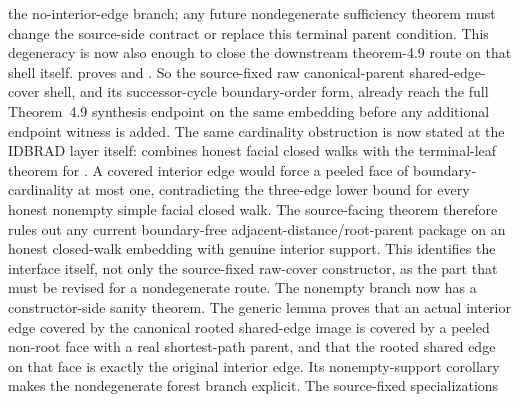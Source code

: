 \documentclass[11pt]{article}
\begin{document}
the no-interior-edge branch; any future nondegenerate sufficiency theorem must
change the source-side contract or replace this terminal parent condition.
This degeneracy is now also enough to close the downstream theorem-4.9 route on
that shell itself.   proves
and
.
So the source-fixed raw canonical-parent shared-edge-cover shell, and its
successor-cycle boundary-order form, already reach the full Theorem~4.9
synthesis endpoint on the same embedding before any additional endpoint witness
is added.
The same cardinality obstruction is now stated at the IDBRAD layer itself:
combines honest facial closed walks with the terminal-leaf theorem for
.  A covered interior edge
would force a peeled face of boundary-cardinality at most one, contradicting
the three-edge lower bound for every honest nonempty simple facial closed
walk.  The source-facing theorem
therefore rules out any current boundary-free adjacent-distance/root-parent
package on an honest closed-walk embedding with genuine interior support.
This identifies the interface itself, not only the source-fixed raw-cover
constructor, as the part that must be revised for a nondegenerate route.
The nonempty branch now has a constructor-side sanity theorem.  The generic
lemma
proves that an actual interior edge covered by the canonical rooted shared-edge
image is covered by a peeled non-root face with a real shortest-path parent,
and that the rooted shared edge on that face is exactly the original interior
edge.  Its nonempty-support corollary
makes the nondegenerate forest branch explicit.  The source-fixed
specializations
\end{document}
